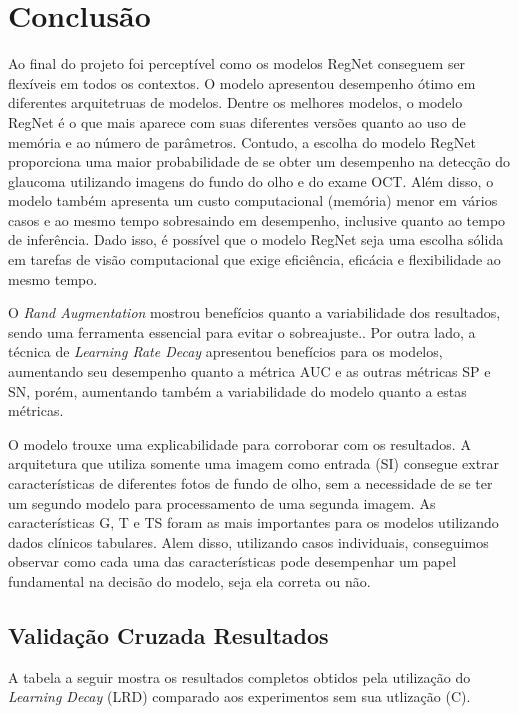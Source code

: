 \documentclass[ %
	msc, %
	portugues %
]{../ppgccufmg}
\begin{document}
    \chapter{Conclusão}
    \label{conclusion}

    Ao final do projeto foi perceptível como os modelos RegNet conseguem ser flexíveis em todos os
    contextos. O modelo apresentou desempenho ótimo em diferentes arquitetruas de modelos. Dentre os
    melhores modelos, o modelo RegNet é o que mais aparece com suas diferentes versões quanto ao uso
    de memória e ao número de parâmetros. Contudo, a escolha do modelo RegNet proporciona uma maior
    probabilidade de se obter um desempenho na detecção do glaucoma utilizando imagens do fundo do
    olho e do exame OCT. Além disso, o modelo também apresenta um custo computacional (memória)
    menor em vários casos e ao mesmo tempo sobresaindo em desempenho, inclusive quanto ao tempo de
    inferência. Dado isso, é possível que o modelo RegNet seja uma escolha sólida em tarefas de
    visão computacional que exige eficiência, eficácia e flexibilidade ao mesmo tempo.

    O \textit{Rand Augmentation} mostrou benefícios quanto a variabilidade dos resultados, sendo uma
    ferramenta essencial para evitar o sobreajuste.. Por outra lado, a
    técnica de \textit{Learning Rate Decay} apresentou benefícios para os modelos, aumentando seu
    desempenho quanto a métrica AUC e as outras métricas SP e SN, porém, aumentando também a
    variabilidade do modelo quanto a estas métricas.

    O modelo trouxe uma explicabilidade para corroborar com os resultados. A arquitetura que utiliza
    somente uma imagem como entrada (SI) consegue extrar características de diferentes fotos de
    fundo de olho, sem a necessidade de se ter um segundo modelo para processamento de uma segunda
    imagem. As características G, T e TS foram as mais importantes para os modelos utilizando dados
    clínicos tabulares. Alem disso, utilizando casos individuais, conseguimos observar como cada uma
    das características pode desempenhar um papel fundamental na decisão do modelo, seja ela correta
    ou não.


    
    

    \begin{apendices}

        \chapter{Validação Cruzada Resultados}
        \label{ap:crosscomplete}
        A tabela a seguir mostra os resultados completos obtidos pela utilização do \textit{Learning
        Decay} (LRD) comparado aos experimentos sem sua utlização (C).
        
    \end{apendices}
\end{document}
